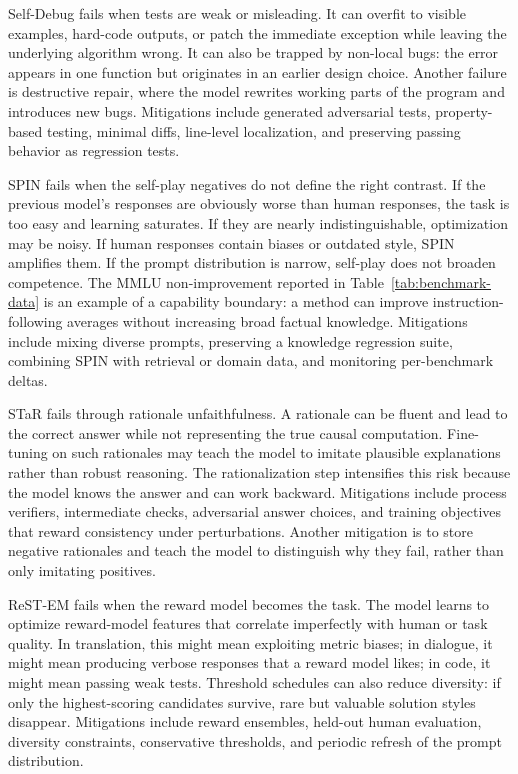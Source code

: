 Self-Debug fails when tests are weak or misleading. It can overfit to visible examples, hard-code outputs, or patch the immediate exception while leaving the underlying algorithm wrong. It can also be trapped by non-local bugs: the error appears in one function but originates in an earlier design choice. Another failure is destructive repair, where the model rewrites working parts of the program and introduces new bugs. Mitigations include generated adversarial tests, property-based testing, minimal diffs, line-level localization, and preserving passing behavior as regression tests.

SPIN fails when the self-play negatives do not define the right contrast. If the previous model's responses are obviously worse than human responses, the task is too easy and learning saturates. If they are nearly indistinguishable, optimization may be noisy. If human responses contain biases or outdated style, SPIN amplifies them. If the prompt distribution is narrow, self-play does not broaden competence. The MMLU non-improvement reported in Table~\ref{tab:benchmark-data} is an example of a capability boundary: a method can improve instruction-following averages without increasing broad factual knowledge. Mitigations include mixing diverse prompts, preserving a knowledge regression suite, combining SPIN with retrieval or domain data, and monitoring per-benchmark deltas.

STaR fails through rationale unfaithfulness. A rationale can be fluent and lead to the correct answer while not representing the true causal computation. Fine-tuning on such rationales may teach the model to imitate plausible explanations rather than robust reasoning. The rationalization step intensifies this risk because the model knows the answer and can work backward. Mitigations include process verifiers, intermediate checks, adversarial answer choices, and training objectives that reward consistency under perturbations. Another mitigation is to store negative rationales and teach the model to distinguish why they fail, rather than only imitating positives.

ReST-EM fails when the reward model becomes the task. The model learns to optimize reward-model features that correlate imperfectly with human or task quality. In translation, this might mean exploiting metric biases; in dialogue, it might mean producing verbose responses that a reward model likes; in code, it might mean passing weak tests. Threshold schedules can also reduce diversity: if only the highest-scoring candidates survive, rare but valuable solution styles disappear. Mitigations include reward ensembles, held-out human evaluation, diversity constraints, conservative thresholds, and periodic refresh of the prompt distribution.

